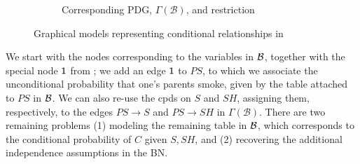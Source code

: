 \documentclass{article}
\theoremstyle{plain}
\theoremstyle{definition}
\newenvironment{example}
	{\pushQED{\qed}\renewcommand{\qedsymbol}{$\triangle$}\examplex}
	{\popQED\endexamplex%
}
\theoremstyle{remark}
\newcommand\PDGof{\Gamma}
\newcommand{\MN}{PDG}
\numberwithin{equation}{section}
\begin{document}
\begin{example}[emulating a BN]
\begin{figure*}[ht!]
\begin{subfigure}[b]{0.55\textwidth}
{}
				\caption{Corresponding \MN, $\PDGof(\mathcal B)$, and restriction}
				\label{subfig:smoking-pdg}
			\end{subfigure}
		
			\caption{Graphical models representing conditional relationships in }
			\label{fig:smoking-bn+pdg}
		\end{figure*}
		
%

We start with the nodes corresponding to the variables in $\cal B$,
together with the 
special node $\sf 1$ from %
; we add
an edge ${\sf 1}$ to $\mathit{PS}$, to which we associate the
unconditional probability that one's parents smoke, given by the table
attached to $\mathit{PS}$ in $\cal B$. 
We can also re-use the cpds on $S$ and
                $\mathit{SH}$, assigning them, respectively, to the
                edges $PS \to S$ and $PS \to SH$ in $\PDGof(\mathcal
                B)$. There are two remaining problems
				(1) modeling
                the remaining table in $\cal B$, which corresponds to
                the conditional probability of $C$ given $S,SH$, and
                (2) recovering the additional independence assumptions
                in the BN. 


\end{example}
\end{document}

